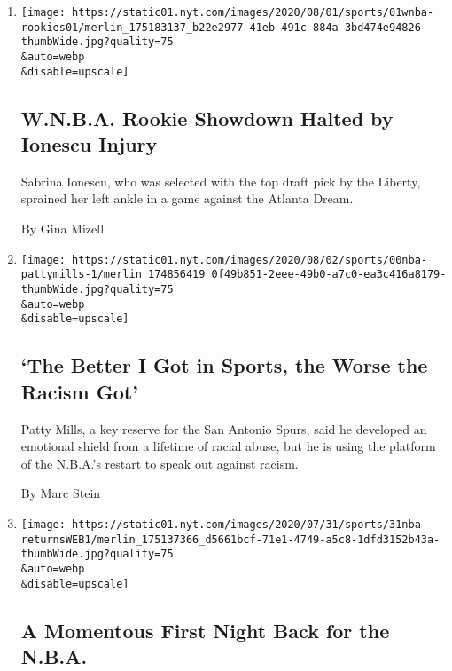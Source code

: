 \begin{enumerate}
\def\labelenumi{\arabic{enumi}.}
\item
  \href{/2020/08/01/sports/basketball/sabrina-ionescu-injury.html}{}

  \texttt{[image: https://static01.nyt.com/images/2020/08/01/sports/01wnba-rookies01/merlin\_175183137\_b22e2977-41eb-491c-884a-3bd474e94826-thumbWide.jpg?quality=75\\\&auto=webp\\\&disable=upscale]}

  \hypertarget{wnba-rookie-showdown-halted-by-ionescu-injury}{%
  \subsection{W.N.B.A. Rookie Showdown Halted by Ionescu
  Injury}\label{wnba-rookie-showdown-halted-by-ionescu-injury}}

  Sabrina Ionescu, who was selected with the top draft pick by the
  Liberty, sprained her left ankle in a game against the Atlanta Dream.

  By Gina Mizell
\item
  \href{/2020/07/31/sports/basketball/spurs-patty-mills.html}{}

  \texttt{[image: https://static01.nyt.com/images/2020/08/02/sports/00nba-pattymills-1/merlin\_174856419\_0f49b851-2eee-49b0-a7c0-ea3c416a8179-thumbWide.jpg?quality=75\\\&auto=webp\\\&disable=upscale]}

  \hypertarget{the-better-i-got-in-sports-the-worse-the-racism-got}{%
  \subsection{`The Better I Got in Sports, the Worse the Racism
  Got'}\label{the-better-i-got-in-sports-the-worse-the-racism-got}}

  Patty Mills, a key reserve for the San Antonio Spurs, said he
  developed an emotional shield from a lifetime of racial abuse, but he
  is using the platform of the N.B.A.'s restart to speak out against
  racism.

  By Marc Stein
\item
  \href{/2020/07/31/sports/basketball/nba-opening-night.html}{}

  \texttt{[image: https://static01.nyt.com/images/2020/07/31/sports/31nba-returnsWEB1/merlin\_175137366\_d5661bcf-71e1-4749-a5c8-1dfd3152b43a-thumbWide.jpg?quality=75\\\&auto=webp\\\&disable=upscale]}

  \hypertarget{a-momentous-first-night-back-for-the-nba}{%
  \subsection{A Momentous First Night Back for the
  N.B.A.}\label{a-momentous-first-night-back-for-the-nba}}


\end{enumerate}
